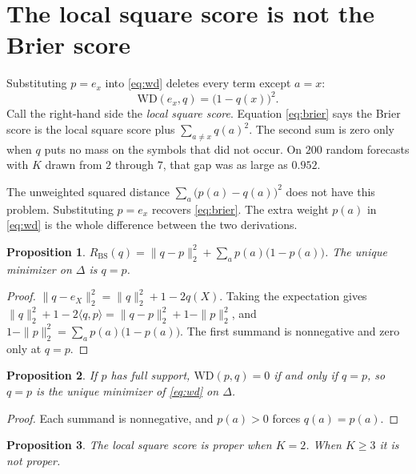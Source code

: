 \documentclass[10pt]{article}
\newtheorem{proposition}{Proposition}
\newcommand{\BS}{\mathrm{BS}}
\newcommand{\WD}{\mathrm{WD}}
\begin{document}
\section{The local square score is not the Brier score}
\label{sec:identity}

Substituting $p=e_x$ into \eqref{eq:wd} deletes every term except $a=x$:
\begin{equation}
\label{eq:local-square}
\WD(e_x,q) = \bigl(1-q(x)\bigr)^2.
\end{equation}
Call the right-hand side the \emph{local square score}.
Equation \eqref{eq:brier} says the Brier score is the local square score plus $\sum_{a\neq x} q(a)^2$.
The second sum is zero only when $q$ puts no mass on the symbols that did not occur.
On $200$ random forecasts with $K$ drawn from $2$ through $7$, that gap was as large as $0.952$.

The unweighted squared distance $\sum_a\bigl(p(a)-q(a)\bigr)^2$ does not have this problem.
Substituting $p=e_x$ recovers \eqref{eq:brier}.
The extra weight $p(a)$ in \eqref{eq:wd} is the whole difference between the two derivations.

\begin{proposition}
\label{prop:brier-pop}
$R_{\BS}(q)=\|q-p\|_2^2+\sum_a p(a)\bigl(1-p(a)\bigr)$.
The unique minimizer on $\Delta$ is $q=p$.
\end{proposition}

\begin{proof}
$\|q-e_X\|_2^2=\|q\|_2^2+1-2q(X)$.
Taking the expectation gives $\|q\|_2^2+1-2\langle q,p\rangle=\|q-p\|_2^2+1-\|p\|_2^2$, and $1-\|p\|_2^2=\sum_a p(a)\bigl(1-p(a)\bigr)$.
The first summand is nonnegative and zero only at $q=p$.
\end{proof}

\begin{proposition}
\label{prop:wd}
If $p$ has full support, $\WD(p,q)=0$ if and only if $q=p$, so $q=p$ is the unique minimizer of \eqref{eq:wd} on $\Delta$.
\end{proposition}

\begin{proof}
Each summand is nonnegative, and $p(a)>0$ forces $q(a)=p(a)$.
\end{proof}

\begin{proposition}
\label{prop:local-square}
The local square score is proper when $K=2$.
When $K\ge 3$ it is not proper.
\end{proposition}
\end{document}
